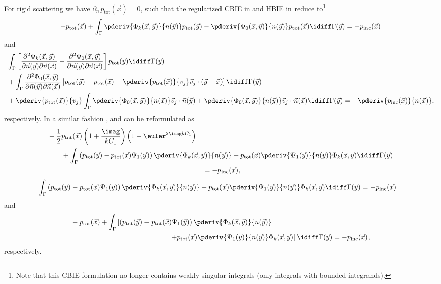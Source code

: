 For rigid scattering we have $\partial_n^+ p_{\mathrm{tot}}(\vec{x}) = 0$, such that the regularized CBIE in  and HBIE in  reduce to\footnote{Note that this CBIE formulation no longer contains weakly singular integrals (only integrals with bounded integrands).}
\begin{equation}\label{Eq3:regulCBIErigid}
	-p_{\mathrm{tot}}(\vec{x}) + \int_\Gamma \pderiv{\Phi_k(\vec{x},\vec{y})}{n(\vec{y})}p_{\mathrm{tot}}(\vec{y}) - \pderiv{\Phi_0(\vec{x},\vec{y})}{n(\vec{y})} p_{\mathrm{tot}}(\vec{x}) \idiff\Gamma(\vec{y}) = -p_{\mathrm{inc}}(\vec{x})
\end{equation}
and 
\begin{align*}
	&\int_\Gamma\left[\frac{\partial^2\Phi_k(\vec{x},\vec{y})}{\partial\vec{n}(\vec{y})\partial\vec{n}(\vec{x})} - \frac{\partial^2\Phi_0(\vec{x},\vec{y})}{\partial\vec{n}(\vec{y})\partial\vec{n}(\vec{x})}\right] p_{\mathrm{tot}}(\vec{y}) \idiff\Gamma(\vec{y}) \\
	&+\int_\Gamma \frac{\partial^2\Phi_0(\vec{x},\vec{y})}{\partial\vec{n}(\vec{y})\partial\vec{n}(\vec{x})}\left[ p_{\mathrm{tot}}(\vec{y}) - p_{\mathrm{tot}}(\vec{x}) - \pderiv{p_{\mathrm{tot}}(\vec{x})}{v_j} \vec{v}_j\cdot(\vec{y}-\vec{x})\right] \idiff\Gamma(\vec{y})\\
	&+\pderiv{p_{\mathrm{tot}}(\vec{x})}{v_j}\int_\Gamma \pderiv{\Phi_0(\vec{x},\vec{y})}{n(\vec{x})}\vec{v}_j\cdot \vec{n}(\vec{y})
	+ \pderiv{\Phi_0(\vec{x},\vec{y})}{n(\vec{y})}\vec{v}_j\cdot \vec{n}(\vec{x}) \idiff\Gamma(\vec{y}) = -\pderiv{p_{\mathrm{inc}}(\vec{x})}{n(\vec{x})},
\end{align*}
respectively. In a similar fashion ,  and  can be reformulated as 
\begin{align*}
	&-\frac{1}{2}p_{\mathrm{tot}}(\vec{x})\left(1+\frac{\imag}{kC_1}\right)\left(1-\euler^{2\imag kC_1}\right) \\
	&\qquad+\int_\Gamma \left(p_{\mathrm{tot}}(\vec{y}) - p_{\mathrm{tot}}(\vec{x})\Psi_1(\vec{y})\right)\pderiv{\Phi_k(\vec{x},\vec{y})}{n(\vec{y})}+ p_{\mathrm{tot}}(\vec{x})\pderiv{\Psi_1(\vec{y})}{n(\vec{y})} \Phi_k(\vec{x},\vec{y})\idiff\Gamma(\vec{y})\\
	&{\hskip22em\relax}=-p_{\mathrm{inc}}(\vec{x}),
\end{align*}
\begin{align*}
	&\int_\Gamma \left(p_{\mathrm{tot}}(\vec{y}) - p_{\mathrm{tot}}(\vec{x})\Psi_1(\vec{y})\right)\pderiv{\Phi_k(\vec{x},\vec{y})}{n(\vec{y})}+ p_{\mathrm{tot}}(\vec{x})\pderiv{\Psi_1(\vec{y})}{n(\vec{y})} \Phi_k(\vec{x},\vec{y})\idiff\Gamma(\vec{y}) =-p_{\mathrm{inc}}(\vec{x})
\end{align*}
and
\begin{align*}
	&-p_{\mathrm{tot}}(\vec{x})+\int_\Gamma\left[\left(p_{\mathrm{tot}}(\vec{y}) - p_{\mathrm{tot}}(\vec{x})\Psi_1(\vec{y})\right)\pderiv{\Phi_k(\vec{x},\vec{y})}{n(\vec{y})}\right.\\
	&{\hskip14em\relax}\left. + p_{\mathrm{tot}}(\vec{x})\pderiv{\Psi_1(\vec{y})}{n(\vec{y})} \Phi_k(\vec{x},\vec{y})\right]\idiff\Gamma(\vec{y})=-p_{\mathrm{inc}}(\vec{x}),
\end{align*}
respectively.

